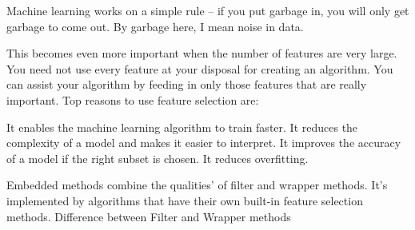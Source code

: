 \documentclass[preprint,12pt]{elsarticle}
\begin{document}
Machine learning works on a simple rule – if you put garbage in, you will only get garbage to come out. By garbage here, I mean noise in data.

This becomes even more important when the number of features are very large. You need not use every feature at your disposal for creating an algorithm. You can assist your algorithm by feeding in only those features that are really important. 
Top reasons to use feature selection are:

    It enables the machine learning algorithm to train faster.
    It reduces the complexity of a model and makes it easier to interpret.
    It improves the accuracy of a model if the right subset is chosen.
    It reduces overfitting.

Embedded methods combine the qualities’ of filter and wrapper methods. It’s implemented by algorithms that have their own built-in feature selection methods.
Difference between Filter and Wrapper methods
\end{document}

